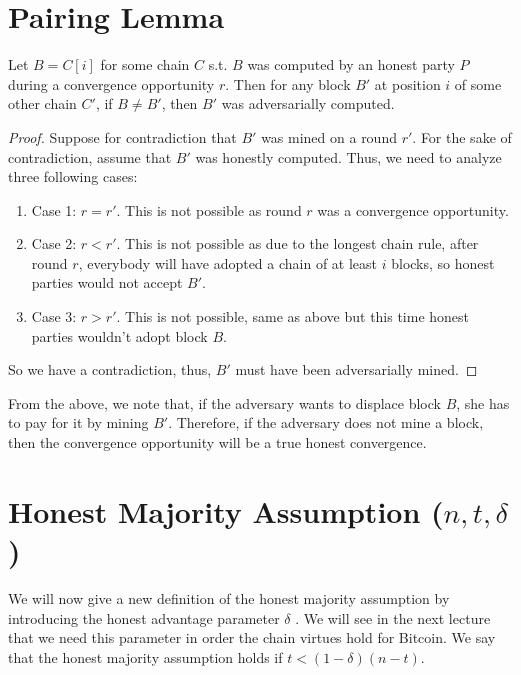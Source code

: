 \section{Pairing Lemma}
\begin{lemma}
Let $B = C[i]$ for some chain $C$ s.t. $B$ was computed by an honest party $P$ during a convergence opportunity $r$. Then for any block $B'$ at position $i$ of some other chain $C'$, if $B \neq B'$, then $B'$ was adversarially computed.
\end{lemma}
\begin{proof}
Suppose for contradiction that $B'$ was mined on a round $r'$. For the sake of contradiction, assume that $B'$ was honestly computed. Thus, we need to analyze three following cases:
\begin{enumerate}
    \item Case 1: $r = r'$. This is not possible as round $r$ was a convergence opportunity.
    \item Case 2: $r < r'$. This is not possible as due to the longest chain rule, after round $r$, everybody will have adopted a chain of at least $i$ blocks, so honest parties would not accept $B'$.
    \item Case 3: $r > r'$. This is not possible, same as above but this time honest parties wouldn't adopt block $B$.
\end{enumerate}
So we have a contradiction, thus, $B'$ must have been adversarially mined.
\end{proof}

From the above, we note that,
if the adversary wants to displace block $B$, she has to pay for it by mining $B'$. Therefore, if the adversary does not mine a block, then the convergence opportunity will be a true honest convergence.

\section{Honest Majority Assumption (\texorpdfstring{$n, t, \delta$}{Lg})}
We will now give a new definition of the honest majority assumption by introducing the honest advantage parameter $\delta$ . We will see in the next lecture that we need this parameter in order the chain virtues hold for Bitcoin. We say that the honest majority assumption holds if $t < (1 - \delta)(n - t)$.

